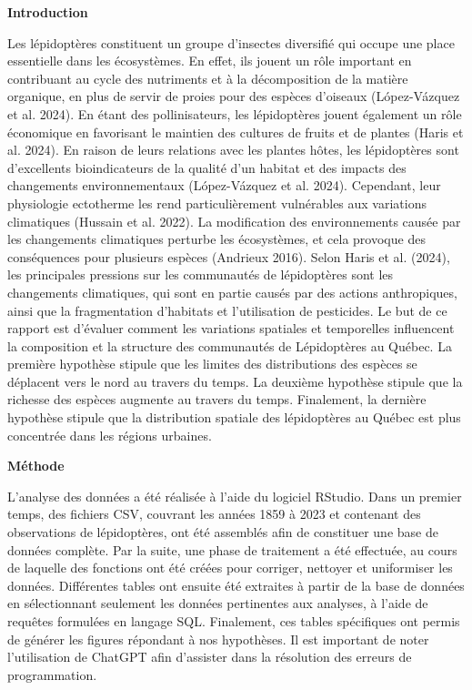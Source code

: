 \documentclass[9pt,twocolumn,twoside,]{pnas-new}
\begin{document}
\textbf{Introduction}

Les lépidoptères constituent un groupe d'insectes diversifié qui occupe
une place essentielle dans les écosystèmes. En effet, ils jouent un rôle
important en contribuant au cycle des nutriments et à la décomposition
de la matière organique, en plus de servir de proies pour des espèces
d'oiseaux (López-Vázquez et al. 2024). En étant des pollinisateurs, les
lépidoptères jouent également un rôle économique en favorisant le
maintien des cultures de fruits et de plantes (Haris et al. 2024). En
raison de leurs relations avec les plantes hôtes, les lépidoptères sont
d'excellents bioindicateurs de la qualité d'un habitat et des impacts
des changements environnementaux (López-Vázquez et al. 2024). Cependant,
leur physiologie ectotherme les rend particulièrement vulnérables aux
variations climatiques (Hussain et al. 2022). La modification des
environnements causée par les changements climatiques perturbe les
écosystèmes, et cela provoque des conséquences pour plusieurs espèces
(Andrieux 2016). Selon Haris et al. (2024), les principales pressions
sur les communautés de lépidoptères sont les changements climatiques,
qui sont en partie causés par des actions anthropiques, ainsi que la
fragmentation d'habitats et l'utilisation de pesticides. Le but de ce
rapport est d'évaluer comment les variations spatiales et temporelles
influencent la composition et la structure des communautés de
Lépidoptères au Québec. La première hypothèse stipule que les limites
des distributions des espèces se déplacent vers le nord au travers du
temps. La deuxième hypothèse stipule que la richesse des espèces
augmente au travers du temps. Finalement, la dernière hypothèse stipule
que la distribution spatiale des lépidoptères au Québec est plus
concentrée dans les régions urbaines.

\vspace{10pt}

\textbf{Méthode}

L'analyse des données a été réalisée à l'aide du logiciel RStudio. Dans
un premier temps, des fichiers CSV, couvrant les années 1859 à 2023 et
contenant des observations de lépidoptères, ont été assemblés afin de
constituer une base de données complète. Par la suite, une phase de
traitement a été effectuée, au cours de laquelle des fonctions ont été
créées pour corriger, nettoyer et uniformiser les données. Différentes
tables ont ensuite été extraites à partir de la base de données en
sélectionnant seulement les données pertinentes aux analyses, à l'aide
de requêtes formulées en langage SQL. Finalement, ces tables spécifiques
ont permis de générer les figures répondant à nos hypothèses. Il est
important de noter l'utilisation de ChatGPT afin d'assister dans la
résolution des erreurs de programmation.
\end{document}
